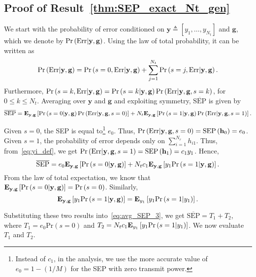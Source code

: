 \documentclass[12pt,draftcls,peerreview,onecolumn]{IEEEtran}
\newcommand{\brac}[1]{\left({#1}\right)}
\newcommand{\define}{\triangleq}
\newcommand{\explow}[2]{{\bf{E}}_{#1}\left[{#2}\right]}
\newcommand{\prob}[1]{\text{Pr}\brac{#1}}
\newcommand{\given}{\arrowvert}
\newcommand{\SEP}{\text{SEP}}
\newcommand{\y}{\mathbf{y}}
\newcommand{\nx}{{0}}
\newcommand{\Err}{{\text{Err}}}
\newcommand{\termone}{T_1}
\newcommand{\termtwo}{T_2}
\newcommand{\Nt}{{N_t}}
\newcommand{\Nr}{{N_r}}
\newcommand{\such}{h}
\newcommand{\puch}{g}
\newcommand{\hk}[1]{{\such_{#1}}}
\newcommand{\g}{\mathbf{\puch}}
\newcommand{\cone}{c_{1}}
\newcommand{\yk}[1]{y_{#1}}
\newcommand{\zerosep}{e_0}
\newcommand{\avgSEP}{\overline{\SEP}}
\newcommand{\sumnr}{\sum_{i=1}^{\Nr}}
\newcommand{\bhk}[1]{\mathbf{\such}_{#1}}
\begin{document}
\subsection{Proof of Result~\ref{thm:SEP_exact_Nt_gen}}
\label{proof:SEP_exact_Nt_gen}
We start with the probability of error conditioned on $\y \define [\yk{1},\ldots,\yk{\Nt}]$  and $\g$, which we denote by $\prob{\Err \given \y,\g}$. Using the law of total probability, it can be written as
%
\begin{equation}
\prob{\Err \given \y,\g} =  \prob{s=\nx,\Err\given\y,\g} + \sum_{j=1}^{\Nt}\prob{s=j,\Err\given\y,\g}.
\label{eq:Perr_all_h}
\end{equation}
%
Furthermore, $\prob{s=k,\Err\given\y,\g}=\prob{s=k\given\y,\g}\prob{\Err\given\y,\g,s=k}$, for $0\leq k \leq \Nt$. Averaging over $\y$ and $\g$ and exploiting symmetry, $\avgSEP$ is given by
\begin{equation*}
\label{eq:avg_SEP_1}
 \avgSEP = \explow{\y,\g}{\prob{s=\nx\given\y,\g}\prob{\Err\given\y,\g,s=\nx}} + \Nt\explow{\y,\g}{\prob{s=1\given\y,\g}\prob{\Err\given\y,\g,s=1}}. 
\end{equation*}

Given $s=0$, the SEP is equal to\footnote{Instead of $c_1$, in the analysis,  we use the more accurate value of $\zerosep=1-\left( 1/M\right) $ for the SEP with zero transmit power.} $\zerosep$. Thus, $\prob{\Err\given\y,\g,s=\nx}=\SEP\left(\bhk{0}\right)=\zerosep$. Given $s=1$, the probability
of error depends only on $\sumnr\hk{i1}$. Thus, from~\eqref{eq:yi_def}, we get $\prob{\Err\given\y,\g,s=1}=\SEP\left(\bhk{1}\right) =\cone \yk{1}$. Hence,
%
\begin{equation}
\label{eq:avg_SEP_3}
\avgSEP  = \zerosep \explow{\y,\g}{\prob{s=\nx\given\y,\g}} + \Nt\cone\explow{\y,\g}{\yk{1}\prob{s=1\given\y,\g}}.
\end{equation}
%
From the law of total expectation, we know that $\explow{\y,\g}{\prob{s=\nx\given\y,\g}} = \prob{s = 0}$.
Similarly, 
\begin{equation}
\label{eq:avg_sep_3_one}
\explow{\y,\g}{\yk{1}\prob{s = 1\given \y,\g} } = \explow{\yk{1}}{\yk{1} \prob{s = 1\given \yk{1}}  }.
\end{equation}

Substituting these two results into~\eqref{eq:avg_SEP_3}, we get
%
$\avgSEP  = \termone + \termtwo$,
%
where $\termone=\zerosep \prob{s = 0}$ and $\termtwo=\Nt\cone \explow{\yk{1}}{ \yk{1}\prob{s = 1\given \yk{1}}}$. We now evaluate $\termone$ and $\termtwo$.
\end{document}
